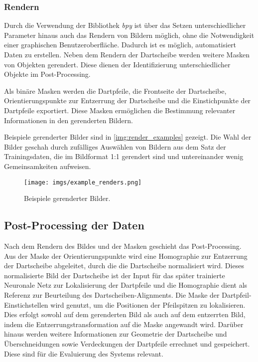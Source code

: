 \subsubsection{Rendern}
\label{sec:impl:daten:python:render}

Durch die Verwendung der Bibliothek \textit{bpy} ist über das Setzen unterschiedlicher Parameter hinaus auch das Rendern von Bildern möglich, ohne die Notwendigkeit einer graphischen Benutzeroberfläche. Dadurch ist es möglich, automatisiert Daten zu erstellen. Neben dem Rendern der Dartscheibe werden weitere Masken von Objekten gerendert. Diese dienen der Identifizierung unterschiedlicher Objekte im Post-Processing.

Als binäre Masken werden die Dartpfeile, die Frontseite der Dartscheibe, Orientierungspunkte zur Entzerrung der Dartscheibe und die Einstichpunkte der Dartpfeile exportiert. Diese Masken ermöglichen die Bestimmung relevanter Informationen in den gerenderten Bildern.

Beispiele gerenderter Bilder sind in \autoref{img:render_examples} gezeigt. Die Wahl der Bilder geschah durch zufälliges Auswählen von Bildern aus dem Satz der Trainingsdaten, die im Bildformat 1:1 gerendert sind und untereinander wenig Gemeinsamkeiten aufweisen.

\begin{figure}
    \centering
    \texttt{[image: imgs/example\_renders.png]}
    \caption{Beispiele gerenderter Bilder.}
    \label{img:render_examples}
\end{figure}

\subsection{Post-Processing der Daten}
\label{sec:impl:daten:postprocess}

Nach dem Rendern des Bildes und der Masken geschieht das Post-Processing. Aus der Maske der Orientierungspunkte wird eine Homographie zur Entzerrung der Dartscheibe abgeleitet, durch die die Dartscheibe normalisiert wird. Dieses normalisierte Bild der Dartscheibe ist der Input für das später trainierte Neuronale Netz zur Lokalisierung der Dartpfeile und die Homographie dient als Referenz zur Beurteilung des Dartscheiben-Alignments. Die Maske der Dartpfeil-Einstichstellen wird genutzt, um die Positionen der Pfeilspitzen zu lokalisieren. Dies erfolgt sowohl auf dem gerenderten Bild als auch auf dem entzerrten Bild, indem die Entzerrungstransformation auf die Maske angewandt wird. Darüber hinaus werden weitere Informationen zur Geometrie der Dartscheibe und Überschneidungen sowie Verdeckungen der Dartpfeile errechnet und gespeichert. Diese sind für die Evaluierung des Systems relevant.

